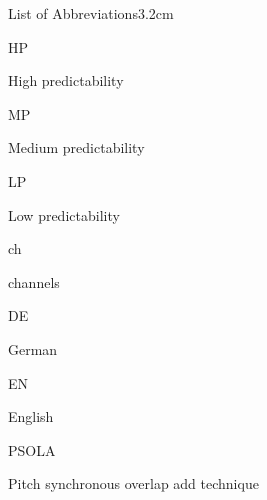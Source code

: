 \documentclass[a4paper, nobind]{templates/ociamthesis}
\begin{document}
\begin{romanpages}

\flushbottom

\tableofcontents

\listoffigures
	\mtcaddchapter

\listoftables
  \mtcaddchapter
\begin{mclistof}{List of Abbreviations}{3.2cm}

\item[HP]

High predictability

\item[MP]

Medium predictability

\item[LP]

Low predictability

\item[ch]

channels

\item[DE]

German

\item[EN]

English

\item[PSOLA]

Pitch synchronous overlap add technique

\end{mclistof} 


\end{romanpages}
\end{document}
